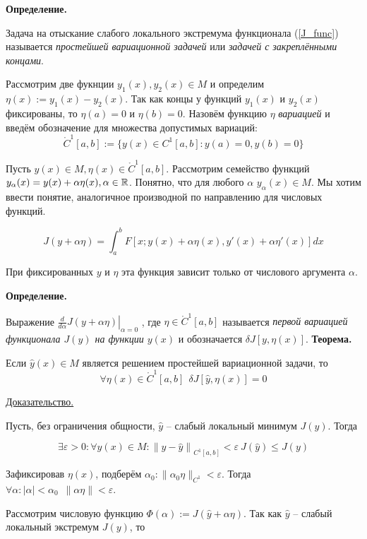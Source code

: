 \textbf{Определение.}

Задача на отыскание слабого локального экстремума функционала (\ref{J_func})
называется \textit{простейшей вариационной задачей} или 
\textit{задачей с закреплёнными концами}.

Рассмотрим две фукнции $y_1(x), y_2(x) \in M$ 
и определим $\eta(x) := y_1(x) - y_2(x)$. Так как концы у функций $y_1(x)$ и
$y_2(x)$ фиксированы, то $\eta(a) = 0$ и $\eta(b) = 0$. Назовём функцию
$\eta$ \textit{вариацией} и введём обозначение для множества 
допустимых вариаций:
$$
    \mathring{C}^1 [a, b] := \{ y(x) \in C^1 [a, b] : y(a) = 0, y(b) = 0\}
$$

Пусть $y(x) \in M, \eta(x) \in \mathring{C}^1 [a, b]$. 
Рассмотрим семейство функций 
$y_{\alpha} (x) = y(x) + \alpha \eta(x), \alpha \in \mathbb{R}$.
Понятно, что для любого $\alpha$ $y_{\alpha}(x) \in M$.
Мы хотим ввести понятие, аналогичное производной по направлению для
числовых функций.

$$
J(y + \alpha \eta) = 
\int_a^b F \left[ x; y(x) + \alpha \eta(x), y'(x) + \alpha \eta'(x) \right]
dx
$$

При фиксированных $y$ и $\eta$ эта функция зависит только от числового
аргумента $\alpha$.
\pagebreak

\textbf{Определение.}

Выражение $\left. \frac{d}{d\alpha} J(y + \alpha \eta) \right|_{\alpha = 0}$
, где $\eta \in \mathring{C}^1 [a, b]$ называется
\textit{первой вариацией функционала $J(y)$ на функции $y(x)$}
и обозначается $\delta J[y, \eta(x)]$.
\bigbreak
\textbf{Теорема.}

Если $\widehat{y}(x) \in M$ является решением простейшей
вариационной задачи, то
$$
\forall \eta(x) \in \mathring{C}^1 [a, b] \ \ 
\delta J \left[ \widehat{y}, \eta(x) \right] = 0
$$

\underline{Доказательство.}

Пусть, без ограничения общности, 
$\widehat{y}$ -- слабый локальный минимум $J(y)$.
Тогда

$$
\exists \varepsilon > 0 : \forall y(x) \in M : 
\left\| y - \widehat{y} \right\|_{C^1 [a, b]} < \varepsilon \ 
J(\widehat{y}) \leqslant J(y)
$$

Зафиксировав $\eta(x)$, подберём 
$\alpha_0 : \| \alpha_0 \eta \|_{C^1} < \varepsilon$.
Тогда 
$\forall \alpha : |\alpha| < \alpha_0 \ \;\| \alpha \eta \| < \varepsilon$.

Рассмотрим числовую функцию 
$\Phi(\alpha) := J(\widehat{y} + \alpha \eta)$.
Так как $\widehat{y}$ -- слабый локальный экстремум $J(y)$, то

